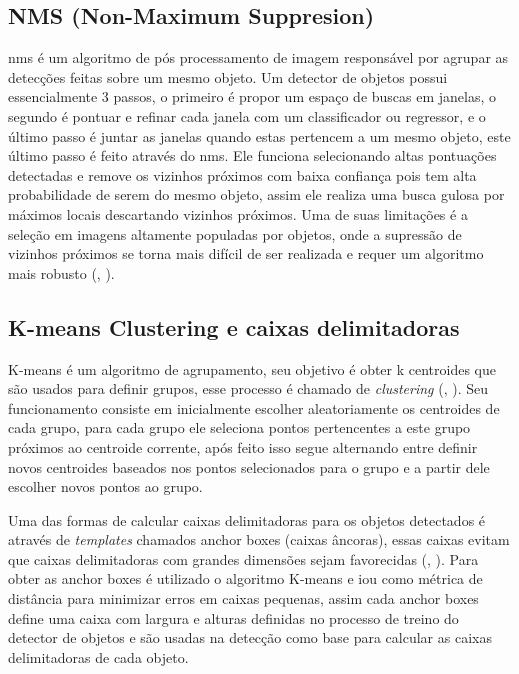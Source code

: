 \documentclass[]{politex}
\begin{document}
\subsection{NMS (Non-Maximum Suppresion)}
\acrfull{nms} é um algoritmo de pós processamento de imagem responsável por agrupar as detecções feitas sobre um mesmo objeto. Um detector de objetos possui essencialmente 3 passos, o primeiro é propor um espaço de buscas em janelas, o segundo é pontuar e refinar cada janela com um classificador ou regressor, e o último passo é juntar as janelas quando estas pertencem a um mesmo objeto, este último passo é feito através do \acrshort{nms}. Ele funciona selecionando altas pontuações detectadas e remove os vizinhos próximos com baixa confiança pois tem alta probabilidade de serem do mesmo objeto, assim ele realiza uma busca gulosa por máximos locais descartando vizinhos próximos. Uma de suas limitações é a seleção em imagens altamente populadas por objetos, onde a supressão de vizinhos próximos se torna mais difícil de ser realizada e requer um algoritmo mais robusto (, \citeyear{nms}).

\subsection{K-means Clustering e caixas delimitadoras}
K-means é um algoritmo de agrupamento, seu objetivo é obter k centroides que são usados para definir grupos, esse processo é chamado de \textit{clustering} (, \citeyear{kmeans}). Seu funcionamento consiste em inicialmente escolher aleatoriamente os centroides de cada grupo, para cada grupo ele seleciona pontos pertencentes a este grupo próximos ao centroide corrente, após feito isso segue alternando entre definir novos centroides baseados nos pontos selecionados para o grupo e a partir dele escolher novos pontos ao grupo.

Uma das formas de calcular caixas delimitadoras para os objetos detectados é através de \textit{templates} chamados anchor boxes (caixas âncoras), essas caixas evitam que caixas delimitadoras com grandes dimensões sejam favorecidas (, \citeyear{boundingbox}). Para obter as anchor boxes é utilizado o algoritmo K-means e \acrshort{iou} como métrica de distância para minimizar erros em caixas pequenas, assim cada anchor boxes define uma caixa com largura e alturas definidas no processo de treino do detector de objetos e são usadas na detecção como base para calcular as caixas delimitadoras de cada objeto.
\end{document}
